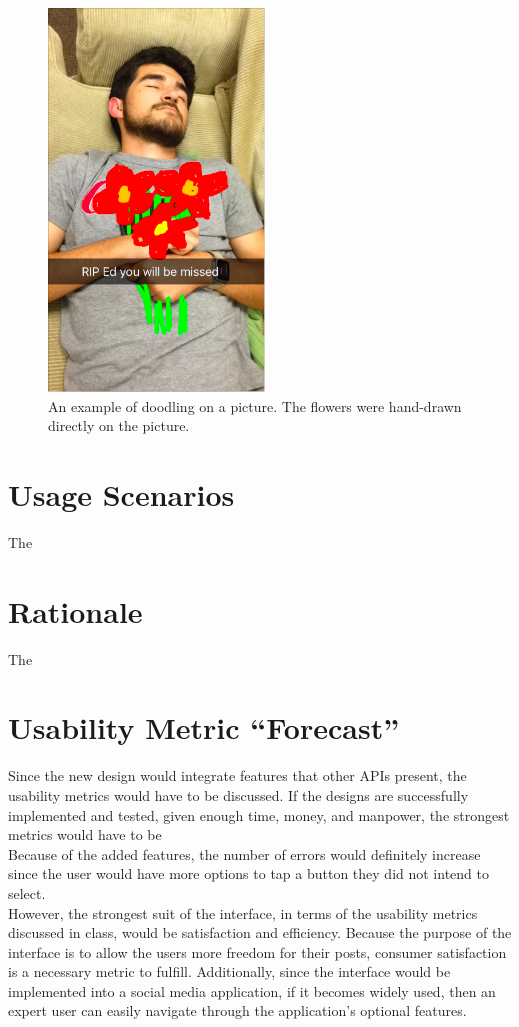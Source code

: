 \documentclass[11pt]{article}
\begin{document}
\begin{figure}[ht]
\centering
\includegraphics[height=4in]{images/rip_ed.png}
\caption{An example of doodling on a picture. The flowers were hand-drawn directly on the picture.}
\label{ed}
\end{figure}

\pagebreak

\section{Usage Scenarios}
\label{Usage Scenarios}
\indent The

\pagebreak

\section{Rationale}
\indent The

\pagebreak

\section{Usability Metric ``Forecast''}
Since the new design would integrate features that other APIs present, the usability metrics would have to be discussed. If the designs are successfully implemented and tested, given enough time, money, and manpower, the strongest metrics would have to be \\
\indent Because of the added features, the number of errors would definitely increase since the user would have more options to tap a button they did not intend to select. \\
\indent However, the strongest suit of the interface, in terms of the usability metrics discussed in class, would be satisfaction and efficiency. Because the purpose of the interface is to allow the users more freedom for their posts, consumer satisfaction is a necessary metric to fulfill. Additionally, since the interface would be implemented into a social media application, if it becomes widely used, then an expert user can easily navigate through the application's optional features.

\clearpage


\end{document}
